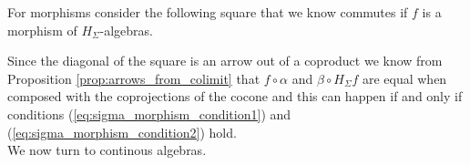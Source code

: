\documentclass[letterpaper, 11pt, oneside]{memoir}
\theoremstyle{myteo}
\newtheorem{definition}[theorem]{Definition}
\numberwithin{equation}{section}
\newcommand{\marginnote}[1]{\marginpar{\footnotesize #1}}
\newcommand{\Set}{\textsf{Set}}
\begin{document}
For morphisms consider the following square that we know commutes if \(f\) is a morphism of \(H_\Sigma\)-algebras.
\begin{center}
\end{center}
Since the diagonal of the square is an arrow out of a coproduct we know from Proposition \ref{prop:arrows_from_colimit} that \(f \circ \alpha\) and \(\beta \circ H_\Sigma f\) are equal when composed with the coprojections of the cocone and this can happen if and only if conditions (\ref{eq:sigma_morphism_condition1}) and (\ref{eq:sigma_morphism_condition2}) hold.\\



We now turn to continous algebras.
\end{document}
